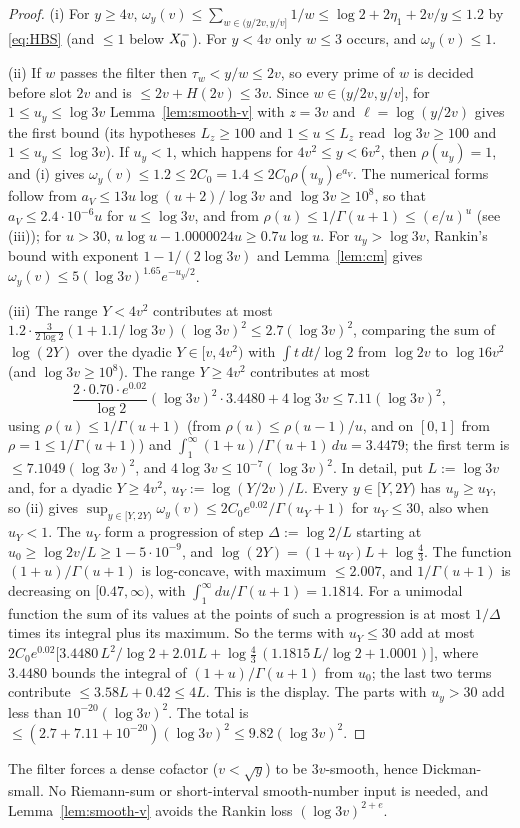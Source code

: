 \begin{proof}
(i) For $y\ge4v$, $\omega_y(v)\le\sum_{w\in(y/2v,y/v]}1/w\le\log2+2\eta_1+2v/y\le1.2$ by \eqref{eq:HBS} (and $\le1$ below $X_0^{-}$). For $y<4v$ only $w\le3$ occurs, and $\omega_y(v)\le1$.

(ii) If $w$ passes the filter then $\tau_w<y/w\le2v$, so every prime of $w$ is decided before slot $2v$ and is $\le2v+H(2v)\le3v$.
Since $w\in(y/2v,y/v]$, for $1\le u_y\le\log3v$ Lemma~\ref{lem:smooth-v} with $z=3v$ and $\ell=\log(y/2v)$ gives the first bound (its
hypotheses $L_z\ge100$ and $1\le u\le L_z$ read $\log3v\ge100$ and $1\le u_y\le\log3v$). If $u_y<1$, which happens for
$4v^2\le y<6v^2$, then $\rho(u_y)=1$, and (i) gives $\omega_y(v)\le1.2\le2C_0=1.4\le2C_0\rho(u_y)e^{a_V}$. The numerical forms
follow from $a_V\le13u\log(u+2)/\log3v$ and $\log3v\ge10^8$, so that $a_V\le2.4\cdot10^{-6}u$ for $u\le\log3v$, and from
$\rho(u)\le1/\Gamma(u+1)\le(e/u)^u$ (see (iii)); for $u>30$, $u\log u-1.0000024u\ge0.7u\log u$. For $u_y>\log3v$, Rankin's bound with exponent $1-1/(2\log3v)$ and Lemma~\ref{lem:cm} gives
$\omega_y(v)\le5(\log3v)^{1.65}e^{-u_y/2}$.

(iii) The range $Y<4v^2$ contributes at most $1.2\cdot\frac3{2\log2}(1+1.1/\log3v)(\log3v)^2\le2.7(\log3v)^2$, comparing the sum
of $\log(2Y)$ over the dyadic $Y\in[v,4v^2)$ with $\int t\,dt/\log2$ from $\log2v$ to $\log16v^2$ (and $\log3v\ge10^8$). The range
$Y\ge4v^2$ contributes at most
\[
  \frac{2\cdot0.70\cdot e^{0.02}}{\log2}(\log3v)^2\cdot3.4480+4\log3v\le7.11(\log3v)^2,
\]
using $\rho(u)\le1/\Gamma(u+1)$ (from $\rho(u)\le\rho(u-1)/u$, and on $[0,1]$ from $\rho=1\le1/\Gamma(u+1)$) and
$\int_1^\infty(1+u)/\Gamma(u+1)\,du=3.4479$; the first term is $\le7.1049(\log3v)^2$, and $4\log3v\le10^{-7}(\log3v)^2$.
In detail, put $L:=\log3v$ and, for a dyadic $Y\ge4v^2$, $u_Y:=\log(Y/2v)/L$. Every $y\in[Y,2Y)$ has $u_y\ge u_Y$, so (ii) gives
$\sup_{y\in[Y,2Y)}\omega_y(v)\le2C_0e^{0.02}/\Gamma(u_Y+1)$ for $u_Y\le30$, also when $u_Y<1$. The $u_Y$ form a progression of step
$\Delta:=\log2/L$ starting at $u_0\ge\log2v/L\ge1-5\cdot10^{-9}$, and $\log(2Y)=(1+u_Y)L+\log\frac43$. The function
$(1+u)/\Gamma(u+1)$ is log-concave, with maximum $\le2.007$, and $1/\Gamma(u+1)$ is decreasing on $[0.47,\infty)$, with
$\int_1^\infty du/\Gamma(u+1)=1.1814$. For a unimodal function the sum of its values at the points of such a progression is at most
$1/\Delta$ times its integral plus its maximum. So the terms with $u_Y\le30$ add at most
$2C_0e^{0.02}\bigl[3.4480\,L^2/\log2+2.01L+\log\tfrac43\,(1.1815\,L/\log2+1.0001)\bigr]$, where $3.4480$ bounds the integral of
$(1+u)/\Gamma(u+1)$ from $u_0$; the last two terms contribute $\le3.58L+0.42\le4L$. This is the display.
The parts with $u_y>30$ add less than $10^{-20}(\log3v)^2$. The total is $\le(2.7+7.11+10^{-20})(\log3v)^2\le9.82(\log3v)^2$.
\end{proof}

The filter forces a dense cofactor ($v<\sqrt y$) to be $3v$-smooth, hence Dickman-small. No Riemann-sum or
short-interval smooth-number input is needed, and Lemma~\ref{lem:smooth-v} avoids the Rankin loss $(\log3v)^{2+e}$.
